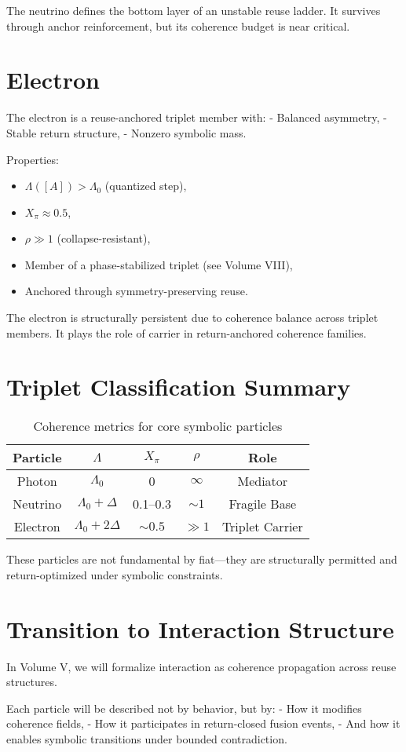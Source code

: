 The neutrino defines the bottom layer of an unstable reuse ladder. It survives through anchor reinforcement, but its coherence budget is near critical.

\section{Electron} \label{sec:electron}

The electron is a reuse-anchored triplet member with:
- Balanced asymmetry,
- Stable return structure,
- Nonzero symbolic mass.

Properties:
\begin{itemize}
  \item $\Lambda([A]) > \Lambda_0$ (quantized step),
  \item $X_\pi \approx 0.5$,
  \item $\rho \gg 1$ (collapse-resistant),
  \item Member of a phase-stabilized triplet (see Volume VIII),
  \item Anchored through symmetry-preserving reuse.
\end{itemize}

The electron is structurally persistent due to coherence balance across triplet members. It plays the role of carrier in return-anchored coherence families.

\section{Triplet Classification Summary} \label{sec:triplet-summary}

\begin{table}[h!]
\centering
\begin{tabular}{|c|c|c|c|c|}
\hline
\textbf{Particle} & $\Lambda$ & $X_\pi$ & $\rho$ & Role \\
\hline
Photon    & $\Lambda_0$      & 0        & $\infty$ & Mediator \\
Neutrino  & $\Lambda_0 + \Delta$ & 0.1–0.3 & $\sim 1$ & Fragile Base \\
Electron  & $\Lambda_0 + 2\Delta$ & $\sim 0.5$ & $\gg 1$ & Triplet Carrier \\
\hline
\end{tabular}
\caption{Coherence metrics for core symbolic particles}
\end{table}

These particles are not fundamental by fiat—they are structurally permitted and return-optimized under symbolic constraints.

\section{Transition to Interaction Structure} \label{sec:volume-v-preview}

In Volume V, we will formalize interaction as coherence propagation across reuse structures.

Each particle will be described not by behavior, but by:
- How it modifies coherence fields,
- How it participates in return-closed fusion events,
- And how it enables symbolic transitions under bounded contradiction.


